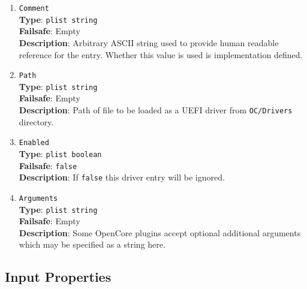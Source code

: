 \documentclass[]{article}
\begin{document}
\begin{enumerate}

\item
  \texttt{Comment}\\
  \textbf{Type}: \texttt{plist\ string}\\
  \textbf{Failsafe}: Empty\\
  \textbf{Description}: Arbitrary ASCII string used to provide human readable
  reference for the entry. Whether this value is used is implementation defined.

\item
  \texttt{Path}\\
  \textbf{Type}: \texttt{plist\ string}\\
  \textbf{Failsafe}: Empty\\
  \textbf{Description}: Path of file to be loaded as a UEFI driver
  from \texttt{OC/Drivers} directory.

\item
  \texttt{Enabled}\\
  \textbf{Type}: \texttt{plist\ boolean}\\
  \textbf{Failsafe}: \texttt{false}\\
  \textbf{Description}: If \texttt{false} this driver entry will be ignored.

\item
  \texttt{Arguments}\\
  \textbf{Type}: \texttt{plist\ string}\\
  \textbf{Failsafe}: Empty\\
  \textbf{Description}: Some OpenCore plugins accept optional additional arguments
  which may be specified as a string here.

\end{enumerate}


\subsection{Input Properties}\label{uefiinputprops}
\end{document}
